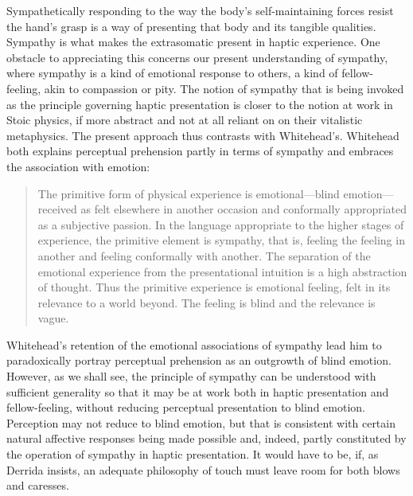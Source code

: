 \documentclass[12pt]{article}
\begin{document}
Sympathetically responding to the way the body's self-maintaining forces resist the hand's grasp is a way of presenting that body and its tangible qualities. Sympathy is what makes the extrasomatic present in haptic experience. One obstacle to appreciating this concerns our present understanding of sympathy, where sympathy is a kind of emotional response to others, a kind of fellow-feeling, akin to compassion or pity. The notion of sympathy that is being invoked as the principle governing haptic presentation is closer to the notion at work in Stoic physics, if more abstract and not at all reliant on on their vitalistic metaphysics. The present approach thus contrasts with Whitehead's. Whitehead both explains perceptual prehension partly in terms of sympathy and embraces the association with emotion:
\begin{quote}
	The primitive form of physical experience is emotional---blind emotion---received as felt elsewhere in another occasion and conformally appropriated as a subjective passion. In the language appropriate to the higher stages of experience, the primitive element is sympathy, that is, feeling the feeling in another and feeling conformally with another. The separation of the emotional experience from the presentational intuition is a high abstraction of thought. Thus the primitive experience is emotional feeling, felt in its relevance to a world beyond. The feeling is blind and the relevance is vague. 
\end{quote}
Whitehead's retention of the emotional associations of sympathy lead him to paradoxically portray perceptual prehension as an outgrowth of blind emotion. However, as we shall see, the principle of sympathy can be understood with sufficient generality so that it may be at work both in haptic presentation and fellow-feeling, without reducing perceptual presentation to blind emotion. Perception may not reduce to blind emotion, but that is consistent with certain natural affective responses being made possible and, indeed, partly constituted by the operation of sympathy in haptic presentation. It would have to be, if, as Derrida insists, an adequate philosophy of touch must leave room for both blows and caresses.


\end{document}
